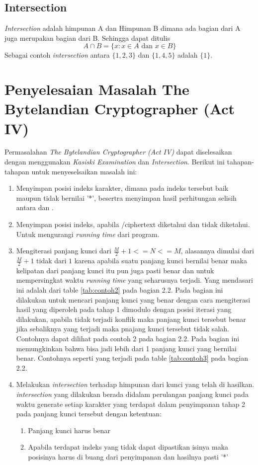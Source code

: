	\subsection{Intersection}
	\textit{Intersection} adalah himpunan A dan Himpunan B dimana ada bagian dari A juga merupakan bagian dari B. Sehingga dapat ditulis 
	$$A\cap{B=\{x:x\in A \textrm{ dan } x \in B \}}$$
	Sebagai contoh \textit{intersection} antara $\{1,2,3\}$ dan $\{1,4,5\}$ adalah $\{1\}$.\cite{devlin_joy_1993}
	
	\section{Penyelesaian Masalah The Bytelandian Cryptographer (Act IV)}
	\label{chapter:solving}
	Permasalahan \textit{The Bytelandian Cryptographer (Act IV)} dapat diselesaikan dengan menggunakan \textit{Kasiski Examination} dan \textit{Intersection}. Berikut ini tahapan-tahapan untuk menyeselsaikan masalah ini:
	\begin{enumerate}
	\item Menyimpan posisi indeks karakter, dimana pada indeks tersebut baik \ciphertext maupun \plaintext tidak bernilai '*', besertra menyimpan hasil perhitungan selisih antara \ciphertext dan \plaintext\cite{john_jones_spoj_2009}.
	\item Menyimpan posisi indeks, apabila /ciphertext diketahui dan \plaintext tidak diketahui. Untuk mengurangi \textit{running time} dari program\cite{john_jones_spoj_2009}.
	\item Mengiterasi panjang kunci dari $\frac{M}{2}+1<=N<=M$, alasannya dimulai dari $\frac{M}{2}+1$ tidak dari $1$ karena apabila suatu panjang kunci bernilai benar maka kelipatan dari panjang kunci itu pun juga pasti benar dan untuk mempersingkat waktu \textit{running time} yang seharusnya terjadi. Yang mendasari ini adalah dari table \ref{tab:contoh2} pada bagian 2.2. Pada bagian ini dilakukan untuk mencari panjang kunci yang benar dengan cara mengiterasi hasil yang diperoleh pada tahap 1 dimodulo dengan posisi iterasi yang dilakukan, apabila tidak terjadi konflik maka panjang kunci tersebut benar jika sebaliknya yang terjadi maka pnajang kunci tersebut tidak salah. Contohnya dapat dilihat pada contoh 2 pada bagian 2.2. Pada bagian ini memungkinkan bahwa bisa jadi lebih dari 1 panjang kunci yang bernilai benar. Contohnya seperti yang terjadi pada table \ref{tab:contoh3} pada bagian 2.2. 
	\item Melakukan \textit{intersection} terhadap himpunan dari kunci yang telah di hasilkan\cite{john_jones_spoj_2009}. \textit{intersection} yang dilakukan berada didalam perulangan panjang kunci pada waktu generate setiap karakter yang terdapat dalam penyimpanan tahap 2 pada panjang kunci tersebut dengan ketentuan:
	\begin{enumerate}
	\item Panjang kunci harus benar
	\item Apabila terdapat indeks yang tidak dapat dipastikan isinya maka posisinya harus di buang dari penyimpanan dan hasilnya pasti '*'
	\end{enumerate}
	\end{enumerate}
